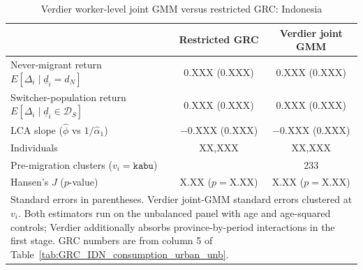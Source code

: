 \begin{table}[ht]
\centering
\small
\caption{Verdier worker-level joint GMM versus restricted GRC: Indonesia}
\label{tab:verdier_robust_joint_gmm_IDN}
\begin{tabular}{lcc}
\hline\hline
 & Restricted GRC & Verdier joint GMM \\
\hline
Never-migrant return $E[\Delta_i \mid \underline d_i = d_N]$ & 0.XXX (0.XXX) & 0.XXX (0.XXX) \\
Switcher-population return $E[\Delta_i \mid \underline d_i \in \mathcal D_S]$ & 0.XXX (0.XXX) & 0.XXX (0.XXX) \\
LCA slope ($\hat\phi$ vs $1/\hat\alpha_1$) & $-$0.XXX (0.XXX) & $-$0.XXX (0.XXX) \\
\hline
Individuals & XX,XXX & XX,XXX \\
Pre-migration clusters ($v_i = \texttt{kabu}$) & & 233 \\
Hansen's $J$ ($p$-value) & X.XX ($p = $X.XX) & X.XX ($p = $X.XX) \\
\hline\hline
\multicolumn{3}{p{0.92\linewidth}}{\footnotesize Standard errors in parentheses. Verdier joint-GMM standard errors clustered at $v_i$. Both estimators run on the unbalanced panel with age and age-squared controls; Verdier additionally absorbs province-by-period interactions in the first stage. GRC numbers are from column 5 of Table~\ref{tab:GRC_IDN_consumption_urban_unb}.} \\
\end{tabular}
\end{table}
